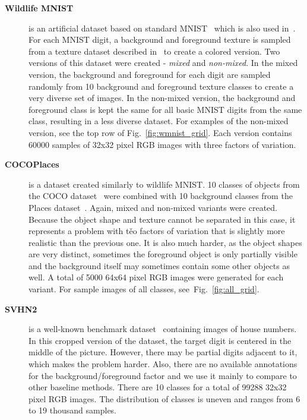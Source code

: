 \begin{description}
    \item[\textbf{Wildlife MNIST}] is an artificial dataset based on standard MNIST~\cite{lecun2010mnist} which is also used in~\cite{sauer2021counterfactual}. For each MNIST digit, a background and foreground texture is sampled from a texture dataset described in~\cite{cimpoi2014describing} to create a colored version. Two versions of this dataset were created - \textit{mixed} and \textit{non-mixed}. In the mixed version, the background and foreground for each digit are sampled randomly from 10 background and foreground texture classes to create a very diverse set of images. In the non-mixed version, the background and foreground class is kept the same for all basic MNIST digits from the same class, resulting in a less diverse dataset. For examples of the non-mixed version, see the top row of Fig.~\ref{fig:wmnist_grid}. Each version contains 60000 samples of 32x32 pixel RGB images with three factors of variation.
    
    \item[\textbf{COCOPlaces}] is a dataset created similarly to wildlife MNIST. 10 classes of objects from the COCO dataset~\cite{lin2014microsoft} were combined with 10 background classes from the Places dataset~\cite{zhou2017places}. Again, mixed and non-mixed variants were created. Because the object shape and texture cannot be separated in this case, it represents a problem with těo factors of variation that is slightly more realistic than the previous one. It is also much harder, as the object shapes are very distinct, sometimes the foreground object is only partially visible and the background itself may sometimes contain some other objects as well. A total of 5000 64x64 pixel RGB images were generated for each variant. For sample images of all classes, see~Fig.~\ref{fig:all_grid}.

    \item[\textbf{SVHN2}] is a well-known benchmark dataset~\cite{netzer2011reading} containing images of house numbers. In this cropped version of the dataset, the target digit is centered in the middle of the picture. However, there may be partial digits adjacent to it, which makes the problem harder. Also, there are no available annotations for the background/foreground factor and we use it mainly to compare to other baseline methods. There are 10 classes for a total of 99288 32x32 pixel RGB images. The distribution of classes is uneven and ranges from 6 to 19 thousand samples. 
    

\end{description}
